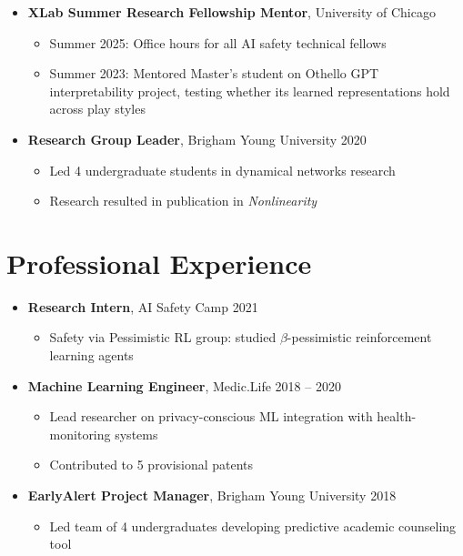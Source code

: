 \documentclass[11pt,letterpaper]{article}
\begin{document}
\begin{itemize}[leftmargin=*]
    \item \textbf{XLab Summer Research Fellowship Mentor}, University of Chicago
    \begin{itemize}
        \item Summer 2025: Office hours for all AI safety technical fellows
        \item Summer 2023: Mentored Master's student on Othello GPT interpretability project, testing whether its learned representations hold across play styles
    \end{itemize}
    
    \item \textbf{Research Group Leader}, Brigham Young University \hfill 2020
    \begin{itemize}
        \item Led 4 undergraduate students in dynamical networks research
        \item Research resulted in publication in \textit{Nonlinearity}
    \end{itemize}
\end{itemize}

\section*{Professional Experience}

\begin{itemize}[leftmargin=*]
    \item \textbf{Research Intern}, AI Safety Camp \hfill 2021
    \begin{itemize}
        \item Safety via Pessimistic RL group: studied $\beta$-pessimistic reinforcement learning agents
    \end{itemize}

    \item \textbf{Machine Learning Engineer}, Medic.Life \hfill 2018 -- 2020
    \begin{itemize}
        \item Lead researcher on privacy-conscious ML integration with health-monitoring systems
        \item Contributed to 5 provisional patents
    \end{itemize}
    
    \item \textbf{EarlyAlert Project Manager}, Brigham Young University \hfill 2018
    \begin{itemize}
        \item Led team of 4 undergraduates developing predictive academic counseling tool
    \end{itemize}
\end{itemize}
\end{document}
